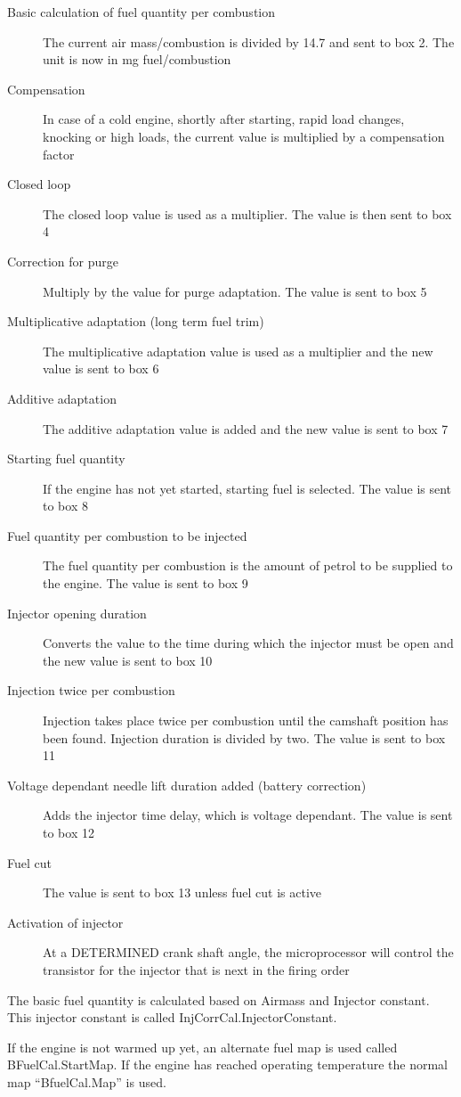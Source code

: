 \documentclass[11pt,a4paper]{book}
\begin{document}
\begin{description}
    \item[Basic calculation of fuel quantity per combustion] The current air mass/combustion is divided by 14.7
        and sent to box 2. The unit is now in mg
        fuel/combustion
    \item[Compensation] In case of a cold engine, shortly after starting, rapid
        load changes, knocking or high loads, the current
        value is multiplied by a compensation factor
    \item [Closed loop] The closed loop value is used as a multiplier. The
        value is then sent to box 4
    \item[Correction for purge] Multiply by the value for purge adaptation. The
        value is sent to box 5
    \item[Multiplicative adaptation (long term fuel trim)] The multiplicative adaptation value is used as a
        multiplier and the new value is sent to box 6
    \item[Additive adaptation] The additive adaptation value is added and the new
        value is sent to box 7
    \item[Starting fuel quantity] If the engine has not yet started, starting fuel is
        selected. The value is sent to box 8
    \item[Fuel quantity per combustion to be injected] The fuel quantity per combustion is the amount of
        petrol to be supplied to the engine. The value is sent
        to box 9
    \item[Injector opening duration] Converts the value to the time during which the
        injector must be open and the new value is sent to
        box 10
    \item[Injection twice per combustion] Injection takes place twice per combustion until the
        camshaft position has been found. Injection duration
        is divided by two. The value is sent to box 11
    \item[Voltage dependant needle lift duration added
        (battery correction)]
        Adds the injector time delay, which is voltage
        dependant. The value is sent to box 12
    \item[ Fuel cut] The value is sent to box 13 unless fuel cut is active
    \item[ Activation of injector] At a DETERMINED crank shaft angle, the
        microprocessor will control the transistor for the
        injector that is next in the firing order
\end{description}
The basic fuel quantity is calculated based on Airmass and Injector constant. This injector constant is
called InjCorrCal.InjectorConstant.
\begin{figure}[<+htpb+>]
    \centering
    \missingfigure{}
    \caption{}
    \label{fig:}
\end{figure}
If the engine is not warmed up yet, an alternate fuel map is used called BFuelCal.StartMap. If the
engine has reached operating temperature the normal map “BfuelCal.Map” is used.
\begin{figure}[<+htpb+>]
    \centering
    \missingfigure{}
    \caption{}
    \label{fig:}
\end{figure}
\end{document}
